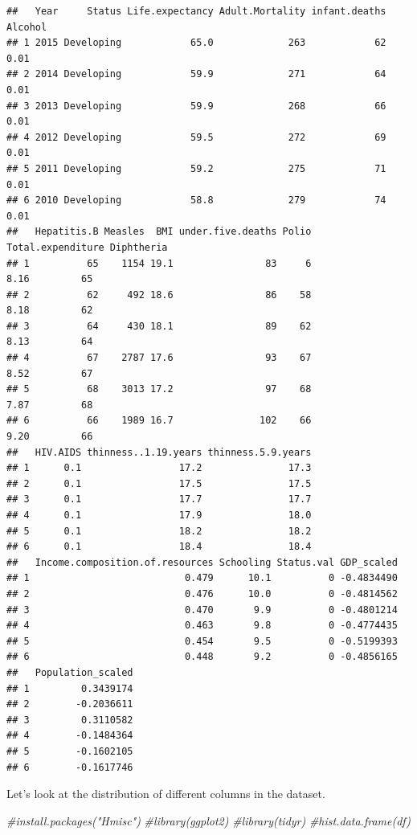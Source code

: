 \documentclass[
]{article}
\newenvironment{Shaded}{\begin{snugshade}}{\end{snugshade}}
\newcommand{\CommentTok}[1]{\textcolor[rgb]{0.56,0.35,0.01}{\textit{#1}}}
\begin{document}
\begin{verbatim}
##   Year     Status Life.expectancy Adult.Mortality infant.deaths Alcohol
## 1 2015 Developing            65.0             263            62    0.01
## 2 2014 Developing            59.9             271            64    0.01
## 3 2013 Developing            59.9             268            66    0.01
## 4 2012 Developing            59.5             272            69    0.01
## 5 2011 Developing            59.2             275            71    0.01
## 6 2010 Developing            58.8             279            74    0.01
##   Hepatitis.B Measles  BMI under.five.deaths Polio Total.expenditure Diphtheria
## 1          65    1154 19.1                83     6              8.16         65
## 2          62     492 18.6                86    58              8.18         62
## 3          64     430 18.1                89    62              8.13         64
## 4          67    2787 17.6                93    67              8.52         67
## 5          68    3013 17.2                97    68              7.87         68
## 6          66    1989 16.7               102    66              9.20         66
##   HIV.AIDS thinness..1.19.years thinness.5.9.years
## 1      0.1                 17.2               17.3
## 2      0.1                 17.5               17.5
## 3      0.1                 17.7               17.7
## 4      0.1                 17.9               18.0
## 5      0.1                 18.2               18.2
## 6      0.1                 18.4               18.4
##   Income.composition.of.resources Schooling Status.val GDP_scaled
## 1                           0.479      10.1          0 -0.4834490
## 2                           0.476      10.0          0 -0.4814562
## 3                           0.470       9.9          0 -0.4801214
## 4                           0.463       9.8          0 -0.4774435
## 5                           0.454       9.5          0 -0.5199393
## 6                           0.448       9.2          0 -0.4856165
##   Population_scaled
## 1         0.3439174
## 2        -0.2036611
## 3         0.3110582
## 4        -0.1484364
## 5        -0.1602105
## 6        -0.1617746
\end{verbatim}

Let's look at the distribution of different columns in the dataset.

\begin{Shaded}
\begin{Highlighting}[]
\CommentTok{\#install.packages("Hmisc")}
\CommentTok{\#library(ggplot2)}
\CommentTok{\#library(tidyr)}
\CommentTok{\#hist.data.frame(df)}
\end{Highlighting}
\end{Shaded}
\end{document}
